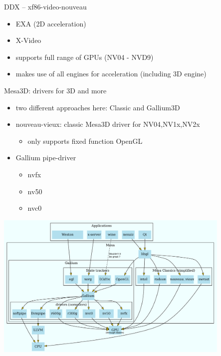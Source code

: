 \documentclass[11pt,english,compress]{beamer}
\begin{document}
		\begin{frame}
			\begin{block}{DDX -- xf86-video-nouveau}
				\begin{itemize}
					\item EXA (2D acceleration) 
					\item X-Video
					\item supports full range of GPUs (NV04 - NVD9)
					\item makes use of all engines for acceleration (including 3D engine)
				\end{itemize}
			\end{block}
		\end{frame}

		\begin{frame}
			\begin{block}{Mesa3D: drivers for 3D and more}
				\begin{itemize}
					\item two different approaches here: Classic and Gallium3D
					\item nouveau-vieux: classic Mesa3D driver for NV04,NV1x,NV2x
						\begin{itemize}
							\item only supports fixed function OpenGL
						\end{itemize}
					\item Gallium pipe-driver
						\begin{itemize}
							\item nvfx
							\item nv50
							\item nvc0
						\end{itemize}
				\end{itemize}
			\end{block}
		\end{frame}

		\begin{frame}
			\begin{center}
				\includegraphics[height=7cm]{imgs/mesa.pdf}
			\end{center}
		\end{frame}
\end{document}
